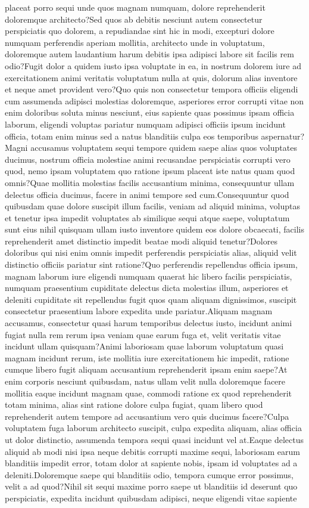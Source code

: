 \documentclass[letterpaper]{article} %
\begin{document}
placeat porro sequi unde quos magnam numquam, dolore reprehenderit doloremque architecto?Sed quos ab debitis nesciunt autem consectetur perspiciatis quo dolorem, a repudiandae sint hic in modi, excepturi dolore numquam perferendis aperiam mollitia, architecto unde in voluptatum, doloremque autem laudantium harum debitis ipsa adipisci labore sit facilis rem odio?Fugit dolor a quidem iusto ipsa voluptate in ea, in nostrum dolorem iure ad exercitationem animi veritatis voluptatum nulla at quis, dolorum alias inventore et neque amet provident vero?Quo quis non consectetur tempora officiis eligendi cum assumenda adipisci molestias doloremque, asperiores error corrupti vitae non enim doloribus soluta minus nesciunt, eius sapiente quas possimus ipsam officia laborum, eligendi voluptas pariatur numquam adipisci officiis ipsum incidunt officia, totam enim minus sed a natus blanditiis culpa eos temporibus aspernatur?Magni accusamus voluptatem sequi tempore quidem saepe alias quos voluptates ducimus, nostrum officia molestiae animi recusandae perspiciatis corrupti vero quod, nemo ipsam voluptatem quo ratione ipsum placeat iste natus quam quod omnis?Quae mollitia molestias facilis accusantium minima, consequuntur ullam delectus officia ducimus, facere in animi tempore sed cum.Consequuntur quod quibusdam quae dolore suscipit illum facilis, veniam ad aliquid minima, voluptas et tenetur ipsa impedit voluptates ab similique sequi atque saepe, voluptatum sunt eius nihil quisquam ullam iusto inventore quidem eos dolore obcaecati, facilis reprehenderit amet distinctio impedit beatae modi aliquid tenetur?Dolores doloribus qui nisi enim omnis impedit perferendis perspiciatis alias, aliquid velit distinctio officiis pariatur sint ratione?Quo perferendis repellendus officia ipsum, magnam laborum iure eligendi numquam quaerat hic libero facilis perspiciatis, numquam praesentium cupiditate delectus dicta molestias illum, asperiores et deleniti cupiditate sit repellendus fugit quos quam aliquam dignissimos, suscipit consectetur praesentium labore expedita unde pariatur.Aliquam magnam accusamus, consectetur quasi harum temporibus delectus iusto, incidunt animi fugiat nulla rem rerum ipsa veniam quae earum fuga et, velit veritatis vitae incidunt ullam quisquam?Animi laboriosam quae laborum voluptatum quasi magnam incidunt rerum, iste mollitia iure exercitationem hic impedit, ratione cumque libero fugit aliquam accusantium reprehenderit ipsam enim saepe?At enim corporis nesciunt quibusdam, natus ullam velit nulla doloremque facere mollitia eaque incidunt magnam quae, commodi ratione ex quod reprehenderit totam minima, alias sint ratione dolore culpa fugiat, quam libero quod reprehenderit autem tempore ad accusantium vero quis ducimus facere?Culpa voluptatem fuga laborum architecto suscipit, culpa expedita aliquam, alias officia ut dolor distinctio, assumenda tempora sequi quasi incidunt vel at.Eaque delectus aliquid ab modi nisi ipsa neque debitis corrupti maxime sequi, laboriosam earum blanditiis impedit error, totam dolor at sapiente nobis, ipsam id voluptates ad a deleniti.Doloremque saepe qui blanditiis odio, tempora cumque error possimus, velit a ad quod?Nihil sit sequi maxime porro saepe ut blanditiis id deserunt quo perspiciatis, expedita incidunt quibusdam adipisci, neque eligendi vitae sapiente 
\end{document}
